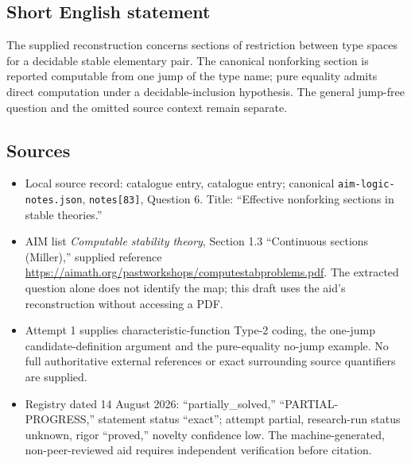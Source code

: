 \documentclass[11pt]{article}
\begin{document}
\subsection{Short English statement}
The supplied reconstruction concerns sections of restriction between type spaces for a decidable stable elementary pair. The canonical nonforking section is reported computable from one jump of the type name; pure equality admits direct computation under a decidable-inclusion hypothesis. The general jump-free question and the omitted source context remain separate.
\subsection{Sources}
\begin{itemize}
\item Local source record: catalogue entry, catalogue entry; canonical \texttt{aim-logic-notes.json}, \texttt{notes[83]}, Question 6. Title: ``Effective nonforking sections in stable theories.''
\item AIM list \emph{Computable stability theory}, Section 1.3 ``Continuous sections (Miller),'' supplied reference \url{https://aimath.org/pastworkshops/computestabproblems.pdf}. The extracted question alone does not identify the map; this draft uses the aid's reconstruction without accessing a PDF.
\item Attempt 1 supplies characteristic-function Type-2 coding, the one-jump candidate-definition argument and the pure-equality no-jump example. No full authoritative external references or exact surrounding source quantifiers are supplied.
\item Registry dated 14 August 2026: ``partially\_solved,'' ``PARTIAL-PROGRESS,'' statement status ``exact''; attempt partial, research-run status unknown, rigor ``proved,'' novelty confidence low. The machine-generated, non-peer-reviewed aid requires independent verification before citation.
\end{itemize}
\end{document}
